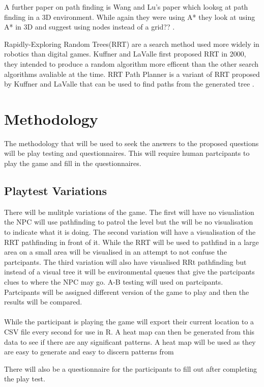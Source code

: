 \documentclass[journal]{IEEEtran}
\begin{document}
A further paper on path finding is Wang and Lu's paper which looksg at path finding in a 3D environment. While again they were using A* they look at using A* in 3D and suggest using nodes instead of a grid?? \cite{wang2012}.

Rapidly-Exploring Random Trees(RRT) are a search method used more widely in robotics than digital games\cite{Kuffner2000}. Kuffner and LaValle first proposed RRT in 2000, they intended to produce a random algorithm more efficent than the other search algorithms avaliable at the time. RRT Path Planner is a variant of RRT proposed by Kuffner and LaValle that can be used to find paths from the generated tree \cite{Kuffner2000}.



\section{Methodology}
The methodology that will be used to seek the answers to the proposed questions will be play testing and questionnaires. This will require human partcipants to play the game and fill in the questionnaires. 

\subsection{Playtest Variations}
There will be mulitple variations of the game. The first will have no visualiation the NPC will use pathfinding to patrol the level but the will be no visualisation to indicate what it is doing.  The second variation will have a visualisation of the RRT pathfinding in front of it. While the RRT will be used to pathfind in a large area on a small area will be visualised in an attempt to not confuse the partcipants. The third variation will also have visualised RRt pathfinding but instead of a visual tree it will be environmental queues that give the partcipants clues to where the NPC may go. A-B testing will used on partcipants. Partcipants will be assigned different version of the game to play and then the results will be compared. \\
\\
While the participant is playing the game will export their current location to a CSV file every second for use in R. A heat map can then be generated from this data to see if there are any significant patterns. A heat map will be used as they are easy to generate and easy to discern patterns from \cite{Wallner2015}

There will also be a questionnaire for the participants to fill out after completing the play test.
\end{document}
